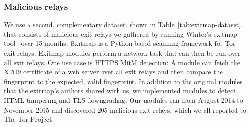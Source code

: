 \subsubsection{Malicious relays}
We use a second, complementary dataset, shown in
Table~\ref{tab:exitmap-dataset}, that consists of malicious exit relays we
gathered by running Winter's exitmap tool~\cite[\S 3.1]{Winter2014a} over 15
months.  Exitmap is a Python-based scanning framework for Tor exit relays.
Exitmap modules perform a network task that can then be run over all exit
relays.  One use case is HTTPS MitM detection: A module can fetch the X.509
certificate of a web server over all exit relays and then compare the
fingerprint to the expected, valid fingerprint.  In addition to the original
modules that the exitmap's authors shared with us, we implemented modules to
detect HTML tampering and TLS downgrading.  Our modules ran from August 2014 to
November 2015 and discovered 205 malicious exit relays, which we all reported to
The Tor Project.

